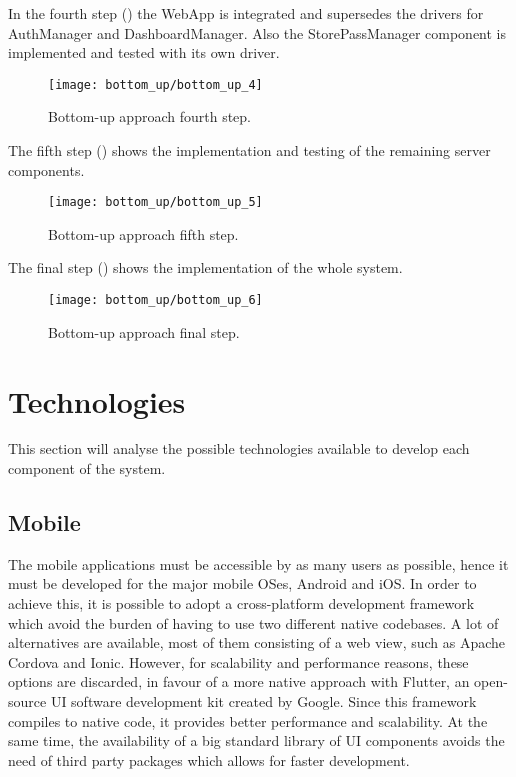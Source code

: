 In the fourth step () the WebApp is integrated and supersedes the drivers for AuthManager and DashboardManager. Also the StorePassManager component is implemented and tested with its own driver.
\begin{figure}[H]
	\centering
	\texttt{[image: bottom\_up/bottom\_up\_4]}
	\caption{Bottom-up approach fourth step.}
	\label{fig:bottom_up_4}
\end{figure}

\clearpage

The fifth step () shows the implementation and testing of the remaining server components.
\begin{figure}[H]
	\centering
	\texttt{[image: bottom\_up/bottom\_up\_5]}
	\caption{Bottom-up approach fifth step.}
	\label{fig:bottom_up_5}
\end{figure}

\clearpage

The final step () shows the implementation of the whole system.
\begin{figure}[H]
	\centering
	\texttt{[image: bottom\_up/bottom\_up\_6]}
	\caption{Bottom-up approach final step.}
	\label{fig:bottom_up_6}
\end{figure}

\clearpage

\section{Technologies}\label{iit:tech}
This section will analyse the possible technologies available to develop each component of the system.

\subsection{Mobile}
The mobile applications must be accessible by as many users as possible, hence it must be developed for the major mobile OSes, Android and iOS.
In order to achieve this, it is possible to adopt a cross-platform development framework which  avoid the burden of having to use two different native codebases.
A lot of alternatives are available, most of them consisting of a web view, such as Apache Cordova and Ionic. 
However, for scalability and performance reasons, these options are discarded, in favour of a more native approach with Flutter, an open-source UI software development kit created by Google.
Since this framework compiles to native code, it provides better performance and scalability. At the same time, the availability of a big standard library of UI components avoids the need of third party packages which allows for faster development.

